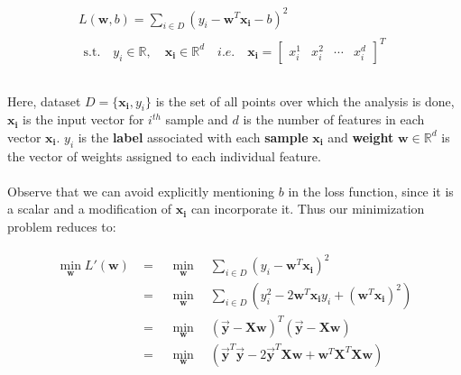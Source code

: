 \documentclass[12pt]{article}
\begin{document}
\begin{gather}
    L(\boldsymbol{w},b) = \sum_{i \in D}   (y_i - \boldsymbol{w}^T\boldsymbol{x_i} - b)^2              \nonumber\\
    \begin{aligned}
        \text{s.t.} \quad   y_i \in \mathbb{R},  \quad \boldsymbol{x_i} \in \mathbb{R}^d \quad i.e. \quad \boldsymbol{x_i} = \begin{bmatrix} x_i^1 & x_i^2 & \cdots & x_i^d\end{bmatrix}^T
        \nonumber\\
    \end{aligned}
\end{gather}\\
Here, dataset $D = \{\boldsymbol{x_i},y_i\}$ is the set of all points over which the analysis is done, $\boldsymbol{x_i}$ is the input vector for $i^{th}$ sample and $d$ is the number of features in each vector $\boldsymbol{x_i}$. $y_i$ is the \textbf{label} associated with each \textbf{sample} $\boldsymbol{x_i}$ and \textbf{weight} $\boldsymbol{w} \in \mathbb{R}^d$ is the vector of weights assigned to each individual feature. \\
\\
Observe that we can avoid explicitly mentioning $b$ in the loss function, since it is a scalar and a modification of $\boldsymbol{x_i}$ can incorporate it. Thus our minimization problem reduces to:

\begin{gather}
    \begin{aligned}
        \min_{\boldsymbol{w}} L'(\boldsymbol{w}) & = \quad \min_{\boldsymbol{w}} \quad \sum_{i \in D}   (y_i - \boldsymbol{w}^T\boldsymbol{x_i})^2              \nonumber\\
        & = \quad \min_{\boldsymbol{w}} \quad \sum_{i \in D}   (y_i^2 - 2\boldsymbol{w}^T\boldsymbol{x_i}y_i + (\boldsymbol{w}^T\boldsymbol{x_i})^2)\nonumber\\
        & = \quad \min_{\boldsymbol{w}} \quad (\vec{\boldsymbol{y}}-\boldsymbol{X}\boldsymbol{w})^T(\vec{\boldsymbol{y}}-\boldsymbol{X}\boldsymbol{w})\nonumber\\
        & = \quad \min_{\boldsymbol{w}} \quad (\vec{\boldsymbol{y}}^T\vec{\boldsymbol{y}}- 2\vec{\boldsymbol{y}}^T\boldsymbol{X}\boldsymbol{w} + \boldsymbol{w}^T\boldsymbol{X}^T\boldsymbol{X}\boldsymbol{w}) \nonumber \\
    \end{aligned}
\end{gather}
\end{document}
